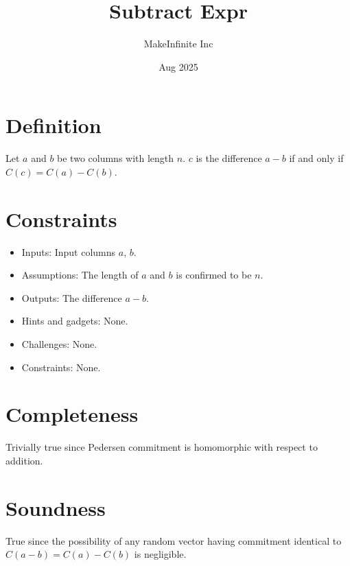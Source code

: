 \documentclass[11pt]{article}
\title{Subtract Expr}
\author{MakeInfinite Inc}
\date{Aug 2025}
\begin{document}
\maketitle

\section{Definition}
\noindent Let $a$ and $b$ be two columns with length $n$. $c$ is the difference $a - b$ if and only if $C(c) = C(a) - C(b)$.
\section{Constraints}
\begin{itemize}
    \item Inputs: Input columns $a$, $b$.
    \item Assumptions: The length of $a$ and $b$ is confirmed to be $n$.
    \item Outputs: The difference $a - b$.
    \item Hints and gadgets: None.
    \item Challenges: None.
    \item Constraints: None.
\end{itemize}
\section{Completeness}
Trivially true since Pedersen commitment is homomorphic with respect to addition.
\section{Soundness}
True since the possibility of any random vector having commitment identical to $C(a-b) = C(a) - C(b)$ is negligible.
\end{document}
